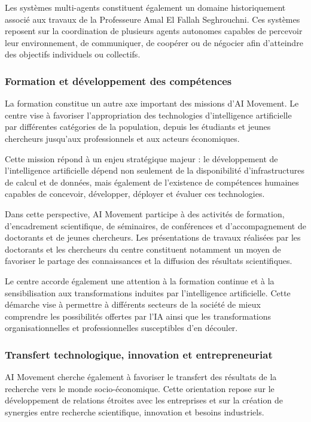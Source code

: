 \documentclass[12pt,a4paper]{report}
\begin{document}
Les systèmes multi-agents constituent également un domaine historiquement associé aux travaux de la Professeure Amal El Fallah Seghrouchni. Ces systèmes reposent sur la coordination de plusieurs agents autonomes capables de percevoir leur environnement, de communiquer, de coopérer ou de négocier afin d'atteindre des objectifs individuels ou collectifs.

\subsubsection{Formation et développement des compétences}

La formation constitue un autre axe important des missions d'AI Movement. Le centre vise à favoriser l'appropriation des technologies d'intelligence artificielle par différentes catégories de la population, depuis les étudiants et jeunes chercheurs jusqu'aux professionnels et aux acteurs économiques.

Cette mission répond à un enjeu stratégique majeur : le développement de l'intelligence artificielle dépend non seulement de la disponibilité d'infrastructures de calcul et de données, mais également de l'existence de compétences humaines capables de concevoir, développer, déployer et évaluer ces technologies.

Dans cette perspective, AI Movement participe à des activités de formation, d'encadrement scientifique, de séminaires, de conférences et d'accompagnement de doctorants et de jeunes chercheurs. Les présentations de travaux réalisées par les doctorants et les chercheurs du centre constituent notamment un moyen de favoriser le partage des connaissances et la diffusion des résultats scientifiques.

Le centre accorde également une attention à la formation continue et à la sensibilisation aux transformations induites par l'intelligence artificielle. Cette démarche vise à permettre à différents secteurs de la société de mieux comprendre les possibilités offertes par l'IA ainsi que les transformations organisationnelles et professionnelles susceptibles d'en découler.

\subsubsection{Transfert technologique, innovation et entrepreneuriat}

AI Movement cherche également à favoriser le transfert des résultats de la recherche vers le monde socio-économique. Cette orientation repose sur le développement de relations étroites avec les entreprises et sur la création de synergies entre recherche scientifique, innovation et besoins industriels.
\end{document}
